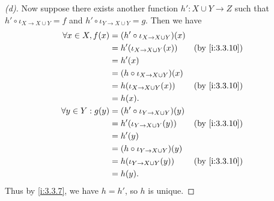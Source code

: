 \begin{proof}[(d)]
  Now suppose there exists another function \(h' : X \cup Y \to Z\) such that \(h' \circ \iota_{X \to X \cup Y} = f\) and \(h' \circ \iota_{Y \to X \cup Y} = g\).
  Then we have
  \begin{align*}
    \forall x \in X, f(x)  & = (h' \circ \iota_{X \to X \cup Y})(x)                    \\
                           & = h'(\iota_{X \to X \cup Y}(x))        &  & \by{i:3.3.10} \\
                           & = h'(x)                                                   \\
                           & = (h \circ \iota_{X \to X \cup Y})(x)                     \\
                           & = h(\iota_{X \to X \cup Y}(x))         &  & \by{i:3.3.10} \\
                           & = h(x).                                                   \\
    \forall y \in Y : g(y) & = (h' \circ \iota_{Y \to X \cup Y})(y)                    \\
                           & = h'(\iota_{Y \to X \cup Y}(y))        &  & \by{i:3.3.10} \\
                           & = h'(y)                                                   \\
                           & = (h \circ \iota_{Y \to X \cup Y})(y)                     \\
                           & = h(\iota_{Y \to X \cup Y}(y))         &  & \by{i:3.3.10} \\
                           & = h(y).
  \end{align*}
  Thus by \cref{i:3.3.7}, we have \(h = h'\), so \(h\) is unique.
\end{proof}
